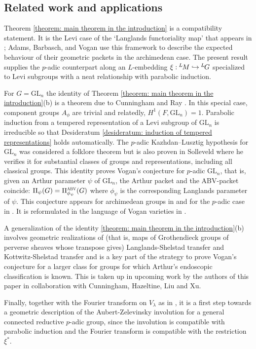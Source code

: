 \documentclass[11pt,letterpaper]{amsart}
\newcommand{\GL}{\mathrm{GL}}
\newcommand{\Lgroup}[1]{{\hskip-2 pt \,^L\hskip-1pt{#1}}}
\newcommand{\ABV}{{\mbox{\raisebox{0pt}{\scalebox{0.6}{$\mathrm{ABV}$}}}}}
\renewcommand{\1}{\mathbbm{1}}
\numberwithin{equation}{section}
\begin{document}
{\subsection{Related work and applications}
Theorem \ref{theorem: main theorem in the introduction} is a compatibility statement.
It is the Levi case of the `Langlands functoriality map' that appears in \cite[Definition 1.36]{ABV92}; Adams, Barbasch, and Vogan use this framework to describe the expected behaviour of their geometric packets in the archimedean case. The present result supplies the $p$-adic counterpart along an $L$-embedding $\xi: \Lgroup{M}\hookrightarrow \Lgroup{G}$ specialized to Levi subgroups with a neat relationship with parabolic induction.

For $G=\GL_n$ the identity of Theorem \ref{theorem: main theorem in the introduction}(b) is a theorem due to Cunningham and Ray \cite{CunninghamRayVoganGLn}. In this special case, component groups $A_\phi$ are trivial and relatedly, $H^1(F,\GL_n)=1$. Parabolic induction from a tempered representation of a Levi subgroup of $\GL_n$ is irreducible so that Desideratum \ref{desideratum: induction of tempered representations} holds automatically. The $p$-adic Kazhdan--Lusztig hypothesis for $\GL_n$ was considered a folklore theorem but is also proven  in Solleveld \cite{Sol25} where he verifies it for substantial classes of groups and representations, including all classical groups. This identity proves Vogan's conjecture for $p$-adic $\GL_n$, that is, given an Arthur parameter $\psi$ of $\GL_n$, the Arthur packet and the ABV-packet coincide: $\Pi_\psi(G)=\Pi^\ABV_{\phi_\psi}(G)$ where $\phi_\psi$ is the corresponding Langlands parameter of $\psi$. This conjecture appears for archimedean groups in \cite{ABV92} and for the $p$-adic case in \cite{Vog93}. It is reformulated in the language of Vogan varieties in \cite[Conjecture 1]{CFMMX22}. 

A generalization of the identity \ref{theorem: main theorem in the introduction}(b) involves geometric realizations of (that is, maps of Grothendieck groups of perverse sheaves whose transpose gives) Langlands-Shelstad transfer and Kottwitz-Shelstad transfer and is a key part of the strategy to prove Vogan's conjecture for a larger class for groups for which Arthur's endoscopic classification is known. This is taken up in upcoming work by the authors of this paper in collaboration with Cunningham, Hazeltine, Liu and Xu. 

Finally, together with the Fourier transform on $V_\lambda$ as in \cite[Section 10.2.4]{CFMMX22}, it is a first step towards a geometric description of the Aubert-Zelevinsky involution for a general connected reductive $p$-adic group, since the involution is compatible with parabolic induction and the Fourier transform is compatible with the restriction $\xi^*$. \fi


}
\end{document}
